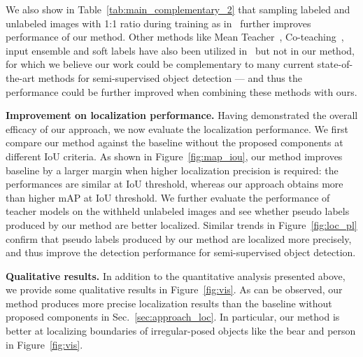 \documentclass[letterpaper]{article} \usepackage{aaai22}  \usepackage{times}  \usepackage{helvet}  \usepackage{courier}  \usepackage[hyphens]{url}  \usepackage{graphicx} \urlstyle{rm} \def\UrlFont{\rm}  \usepackage{natbib}  \usepackage{caption} \DeclareCaptionStyle{ruled}{labelfont=normalfont,labelsep=colon,strut=off} \frenchspacing  \setlength{\pdfpagewidth}{8.5in}  \setlength{\pdfpageheight}{11in}  \usepackage{algorithm}
\begin{document}
We also show in Table~\ref{tab:main_complementary_2} that sampling labeled and unlabeled images with 1:1 ratio during training as in~\cite{unbiasedteacher,tang2021humble} further improves performance of our method.
Other methods like Mean Teacher~\citeyearpar{meanteacher}, Co-teaching~\citeyearpar{coteaching}, input ensemble and soft labels have also been utilized in~\cite{unbiasedteacher,instantteaching,ismt,tang2021humble} but not in our method, for which we believe our work could be complementary to many current state-of-the-art methods for semi-supervised object detection --- and thus the performance could be further improved when combining these methods with ours.


\begin{figure*}[!t] \centering
\begin{minipage}[b]{0.4\linewidth} \centering
  \caption{\textbf{Performance at different IoU criteria} under 2\% COCO setting. }\label{fig:map_iou}
\end{minipage}
\hspace{1.6cm}
\begin{minipage}[b]{0.4\linewidth} \centering
  \caption{\textbf{Evaluating the localization precision of pseudo boxes} from teacher model. } \label{fig:loc_pl}
\end{minipage}
\end{figure*}


\noindent\textbf{Improvement on localization performance.} Having demonstrated the overall efficacy of our approach, we now evaluate the localization performance. We first compare our method against the baseline without the proposed components at different IoU criteria. As shown in Figure~\ref{fig:map_iou}, our method improves baseline by a larger margin when higher localization precision is required: the performances are similar at  IoU threshold, whereas our approach obtains more than  higher mAP at  IoU threshold. We further evaluate the performance of teacher models on the withheld unlabeled images and see whether pseudo labels produced by our method are better localized. Similar trends in Figure~\ref{fig:loc_pl} confirm that pseudo labels produced by our method are localized more precisely, and thus improve the detection performance for semi-supervised object detection. 


\noindent\textbf{Qualitative results.} In addition to the quantitative analysis presented above, we provide some qualitative results in Figure~\ref{fig:vis}. As can be observed, our method produces more precise localization results than the baseline without proposed components in Sec.~\ref{sec:approach_loc}. In particular, our method is better at localizing boundaries of irregular-posed objects like the bear and person in Figure~\ref{fig:vis}.
\end{document}
